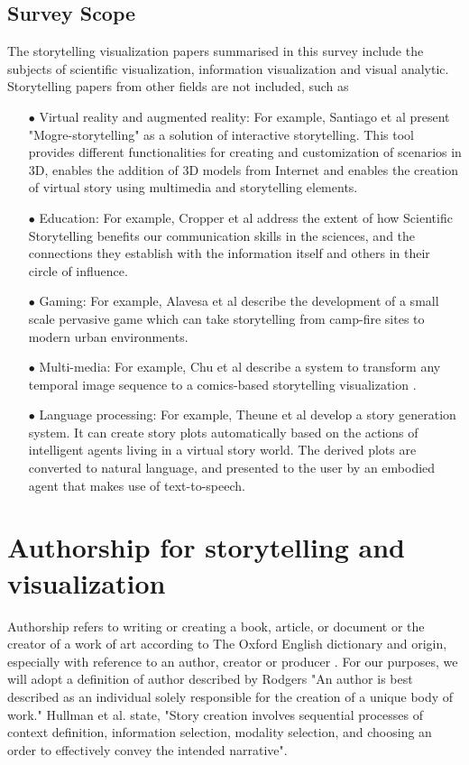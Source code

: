\documentclass{egpubl}
\begin{document}
\subsection{Survey Scope}
The storytelling visualization papers summarised in this survey include the subjects of scientific visualization, information visualization and visual analytic. Storytelling papers from other fields are not included, such as
\begin{enumerate}
\item[$\bullet$] Virtual reality and augmented reality: For example, Santiago et al \cite{santiago2014mogre} present "Mogre-storytelling" as a solution of interactive storytelling. This tool provides different functionalities for creating and customization of scenarios in 3D, enables the addition of 3D models from Internet and enables the creation of virtual story using multimedia and storytelling elements.
\item[$\bullet$] Education:  For example, Cropper et al \cite{cropper2015scientific} address the extent of how Scientific Storytelling benefits our communication skills in the sciences, and the connections they establish with the information itself and others in their circle of influence.
\item[$\bullet$] Gaming:  For example, Alavesa et al\cite{alavesa2013combining} describe the development of a small scale pervasive game which can take storytelling from camp-fire sites to modern urban environments. 
\item[$\bullet$] Multi-media: For example, Chu et al describe a system to transform any temporal image sequence to a comics-based storytelling visualization \cite{chu2015}. 
\item[$\bullet$] Language processing: For example, Theune et al \cite{theune2006generating} develop a story generation system. It can create story plots automatically based on the actions of intelligent agents living in a virtual story world. The derived plots are converted to natural language, and presented to the user by an embodied agent that makes use of text-to-speech.
\end{enumerate}
\section{Authorship for storytelling and visualization}
Authorship refers to writing or creating a book, article, or document or the creator of a work of art according to The Oxford English dictionary\cite{authoship2} and origin, especially with reference to an author, creator or producer \cite{authoship1}. For our purposes, we will adopt a definition of author described by Rodgers\cite{rodgers2011} "An author is best described as an individual solely responsible for the creation of a unique body of work."  Hullman \cite{hullman2013deeper} et al. state, "Story creation involves sequential processes of context definition, information selection, modality selection, and choosing an order to effectively convey the intended narrative".
\end{document}
